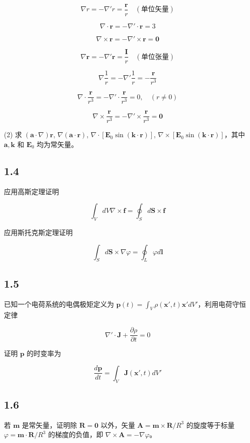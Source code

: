 $$\nabla r = -\nabla' r = \frac{\boldsymbol{r}}{r} \quad (\text{单位矢量})$$

$$\nabla \cdot \boldsymbol{r} = -\nabla' \cdot \boldsymbol{r} = 3$$

$$\nabla \times \boldsymbol{r} = -\nabla' \times \boldsymbol{r} = \boldsymbol{0}$$

$$\nabla \boldsymbol{r} = -\nabla' \boldsymbol{r} = \frac{\boldsymbol{I}}{r} \quad (\text{单位张量})$$

$$\nabla \frac{1}{r} = -\nabla' \frac{1}{r} = -\frac{\boldsymbol{r}}{r^3}$$

$$\nabla \cdot \frac{\boldsymbol{r}}{r^3} = -\nabla' \cdot \frac{\boldsymbol{r}}{r^3} = 0, \quad (r \neq 0)$$

$$\nabla \times \frac{\boldsymbol{r}}{r^3} = -\nabla' \times \frac{\boldsymbol{r}}{r^3} = \boldsymbol{0}$$

(2) 求 $(\boldsymbol{a} \cdot \nabla)\boldsymbol{r}$, $\nabla(\boldsymbol{a} \cdot \boldsymbol{r})$, $\nabla \cdot [\boldsymbol{E}_0 \sin(\boldsymbol{k} \cdot \boldsymbol{r})]$, $\nabla \times [\boldsymbol{E}_0 \sin(\boldsymbol{k} \cdot \boldsymbol{r})]$，其中 $\boldsymbol{a}, \boldsymbol{k}$ 和 $\boldsymbol{E}_0$ 均为常矢量。

\newpage
\subsection{1.4}
应用高斯定理证明

$$\int_V dV \nabla \times \boldsymbol{f} = \oint_S d\boldsymbol{S} \times \boldsymbol{f}$$

应用斯托克斯定理证明

$$\int_S d\boldsymbol{S} \times \nabla \varphi = \oint_L \varphi d\boldsymbol{l}$$

\newpage
\subsection{1.5}
已知一个电荷系统的电偶极矩定义为 $\boldsymbol{p}(t) = \int_V \rho(\boldsymbol{x}', t) \boldsymbol{x}' dV'$，利用电荷守恒定律

$$\nabla' \cdot \boldsymbol{J} + \frac{\partial \rho}{\partial t} = 0$$

证明 $\boldsymbol{p}$ 的时变率为

$$\frac{d\boldsymbol{p}}{dt} = \int_V \boldsymbol{J}(\boldsymbol{x}', t) dV'$$

\newpage
\subsection{1.6}
若 $\boldsymbol{m}$ 是常矢量，证明除 $\boldsymbol{R} = \boldsymbol{0}$ 以外，矢量 $\boldsymbol{A} = \boldsymbol{m} \times \boldsymbol{R}/R^3$ 的旋度等于标量 $\varphi = \boldsymbol{m} \cdot \boldsymbol{R}/R^3$ 的梯度的负值，即 $\nabla \times \boldsymbol{A} = -\nabla \varphi$。

